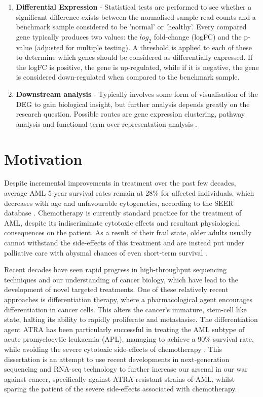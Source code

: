 \begin{enumerate}
\item \textbf{Differential Expression} - Statistical tests are performed to see whether a significant difference exists between the normalised sample read counts and a benchmark sample considered to be 'normal' or 'healthy'. Every compared gene typically produces two values: the $log_{2}$ fold-change (logFC) and the p-value (adjusted for multiple testing). A threshold is applied to each of these to determine which genes should be considered as differentially expressed. If the logFC is positive, the gene is up-regulated, while if it is negative, the gene is considered down-regulated when compared to the benchmark sample.
\item \textbf{Downstream analysis} - Typically involves some form of visualisation of the \ac{DEG} to gain biological insight, but further analysis depends greatly on the research question. Possible routes are gene expression clustering, pathway analysis and functional term over-representation analysis \citep{conesa2016survey, chung2021best}.
\end{enumerate}





\section{Motivation} 
Despite incremental improvements in treatment over the past few decades, average \ac{AML} 5-year survival rates remain at 28\% for affected individuals, which decreases with age and unfavourable cytogenetics, according to the SEER database \citep{sasaki2021novo}. Chemotherapy is currently standard practice for the treatment of \ac{AML}, despite its indiscriminate cytotoxic effects and resultant physiological consequences on the patient. As a result of their frail state, older adults usually cannot withstand the side-effects of this treatment and are instead put under palliative care with abysmal chances of even short-term survival \citep{lancet2018overall}. 

Recent decades have seen rapid progress in high-throughput sequencing techniques and our understanding of cancer biology, which have lead to the development of novel targeted treatments. One of these relatively recent approaches is differentiation therapy, where a pharmacological agent encourages differentiation in cancer cells. This alters the cancer's immature, stem-cell like state, halting its ability to rapidly proliferate and metastasise. The differentiation agent \ac{ATRA} has been particularly successful in treating the \ac{AML} subtype of acute promyelocytic leukaemia (APL), managing to achieve a 90\% survival rate, while avoiding the severe cytotoxic side-effects of chemotherapy \citep{kim2015selection}. This dissertation is an attempt to use recent developments in next-generation sequencing and RNA-seq technology to further increase our arsenal in our war against cancer, specifically against \ac{ATRA}-resistant strains of \ac{AML}, whilst sparing the patient of the severe side-effects associated with chemotherapy.

